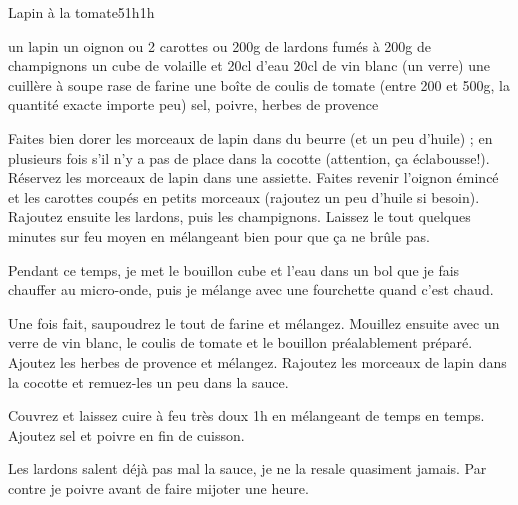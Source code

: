 \begin{recette}{Lapin à la tomate}{5}{1h}{1h}
\begin{ingredients}[4 pers.]
\ingredient un lapin
\ingredient un oignon
 ou 2 carottes
 ou 200g de lardons fumés
 à 200g de champignons
\ingredient un cube de volaille et 20cl d'eau
\ingredient 20cl de vin blanc (un verre)
\ingredient une cuillère à soupe rase de farine
\ingredient une boîte de coulis de tomate (entre 200 et 500g, la quantité exacte importe peu)
\ingredient sel, poivre, herbes de provence
\end{ingredients}

\begin{preparation}
\etape Faites bien dorer les morceaux de lapin dans du beurre (et un peu d'huile) ; en plusieurs fois s'il n'y a pas de place dans la cocotte (attention, ça éclabousse!).
\etape Réservez les morceaux de lapin dans une assiette.
\etape Faites revenir l'oignon émincé et les carottes coupés en petits morceaux (rajoutez un peu d'huile si besoin).
\etape Rajoutez ensuite les lardons, puis les champignons.
\etape Laissez le tout quelques minutes sur feu moyen en mélangeant bien pour que ça ne brûle pas.
\begin{remarque}
Pendant ce temps, je met le bouillon cube et l'eau dans un bol que je fais chauffer au micro-onde, puis je mélange avec une fourchette quand c'est chaud.
\end{remarque}
\etape Une fois fait, saupoudrez le tout de farine et mélangez. 
\etape Mouillez ensuite avec un verre de vin blanc, le coulis de tomate et le bouillon préalablement préparé. Ajoutez les herbes de provence et mélangez.
\etape Rajoutez les morceaux de lapin dans la cocotte et remuez-les un peu dans la sauce.
\end{preparation}

\begin{cuisson}
Couvrez et laissez cuire à feu très doux 1h en mélangeant de temps en temps. Ajoutez sel et poivre en fin de cuisson.
\begin{remarque}
Les lardons salent déjà pas mal la sauce, je ne la resale quasiment jamais. Par contre je poivre avant de faire mijoter une heure.
\end{remarque}
\end{cuisson}
\end{recette}

